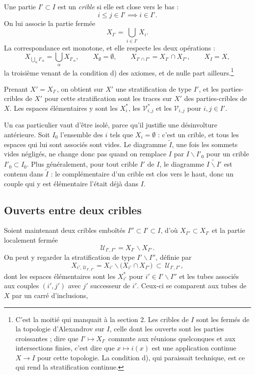 \documentclass[11pt,a4paper]{article}
\begin{document}
Une partie $I' \subset I$ est un \emph{crible} si elle est close vers le bas :
\[
  i \leq j \in I' \implies i \in I'.
\]
On lui associe la partie fermée
\[
  X_{I'} = \bigcup_{i \in I'} X_{i}.
\]
La correspondance est monotone, et elle respecte les deux opérations :
\[
  X_{\bigcup_{\alpha} I'_{\alpha}} = \bigcup_{\alpha} X_{I'_{\alpha}},
  \qquad X_{\emptyset} = \emptyset,
  \qquad
  X_{I' \cap I''} = X_{I'} \cap X_{I''}, \qquad X_{I} = X,
\]
la troisième venant de la condition d) des axiomes, et de nulle part
ailleurs.\footnote{C'est la moitié qui manquait à la section 2. Les cribles de
$I$ sont les fermés de la topologie d'Alexandrov sur $I$, celle dont les ouverts
sont les parties croissantes ; dire que $I' \mapsto X_{I'}$ commute aux réunions
quelconques et aux intersections finies, c'est dire que $x \mapsto i(x)$ est une
application continue $X \to I$ pour cette topologie. La condition d), qui
paraissait technique, est ce qui rend la stratification continue.}

Prenant $X' = X_{I'}$, on obtient sur $X'$ une stratification de type $I'$, et
les parties-cribles de $X'$ pour cette stratification sont les traces sur $X'$
des parties-cribles de $X$. Les espaces élémentaires y sont les $X_{i}^{*}$, les
$\mathcal{V}^{*}_{i,j}$ et les $\mathcal{V}_{i,j}$ pour $i,j \in I'$.

Un cas particulier vaut d'être isolé, parce qu'il justifie une désinvolture
antérieure. Soit $I_{0}$ l'ensemble des $i$ tels que $X_{i} = \emptyset$ : c'est
un crible, et tous les espaces qui lui sont associés sont vides. Le diagramme
$\widetilde{I}$, une fois les sommets vides négligés, ne change donc pas quand on
remplace $I$ par $I \smallsetminus I'_{0}$ pour un crible $I'_{0} \subset I_{0}$.
Plus généralement, pour tout crible $I'$ de $I$, le diagramme
$\widetilde{I \smallsetminus I'}$ est contenu dans $\widetilde{I}$ : le
complémentaire d'un crible est clos vers le haut, donc un couple qui y est
élémentaire l'était déjà dans $I$.

\subsection*{Ouverts entre deux cribles}

Soient maintenant deux cribles emboîtés $I'' \subset I' \subset I$, d'où
$X_{I''} \subset X_{I'}$ et la partie localement fermée
\[
  \mathcal{U}_{I',I''} = X_{I'} \smallsetminus X_{I''}.
\]
On peut y regarder la stratification de type $I' \smallsetminus I''$, définie par
\[
  X_{i',\,\mathcal{U}_{I',I''}}
  = X_{i'} \smallsetminus \bigl(X_{i'} \cap X_{I''}\bigr)
  \ \subset \ \mathcal{U}_{I',I''},
\]
dont les espaces élémentaires sont les $X_{i'}^{*}$ pour
$i' \in I' \smallsetminus I''$ et les tubes associés aux couples $(i',j')$ avec
$j'$ successeur de $i'$. Ceux-ci se comparent aux tubes de $X$ par un carré
d'inclusions,
\end{document}
